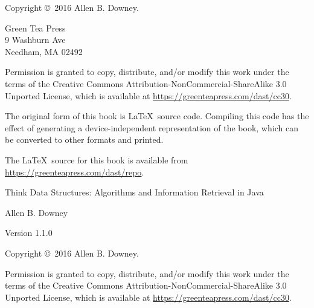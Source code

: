 \documentclass[12pt]{book}
\newcommand{\thetitle}{Think Data Structures}
\newcommand{\thesubtitle}{Algorithms and Information Retrieval in Java}
\newcommand{\theauthors}{Allen B. Downey}
\newcommand{\theversion}{1.1.0}
\theoremstyle{exercise}
\begin{document}
\begin{latexonly}
\newpage
\thispagestyle{empty}

Copyright \copyright ~2016 \theauthors.

\vspace{0.2in}

\begin{flushleft}
Green Tea Press \\
9 Washburn Ave \\
Needham, MA 02492
\end{flushleft}

Permission is granted to copy, distribute, and/or modify this work
under the terms of the Creative Commons
Attribution-NonCommercial-ShareAlike 3.0 Unported License, which is
available at \url{https://greenteapress.com/dast/cc30}.

The original form of this book is \LaTeX\ source code.  Compiling this
code has the effect of generating a device-independent representation
of the book, which can be converted to other formats and printed.

The \LaTeX\ source for this book is available from
\url{https://greenteapress.com/dast/repo}.


\cleardoublepage
\setcounter{tocdepth}{1}
\tableofcontents

\end{latexonly}


\begin{htmlonly}

\vspace{1em}

{\Large \thetitle: \thesubtitle}

{\large \theauthors}

Version \theversion

\vspace{1em}

Copyright \copyright ~2016 \theauthors.

Permission is granted to copy, distribute, and/or modify this work
under the terms of the Creative Commons
Attribution-NonCommercial-ShareAlike 3.0 Unported License, which is
available at \url{https://greenteapress.com/dast/cc30}.

\vspace{1em}

\end{htmlonly}
\end{document}
